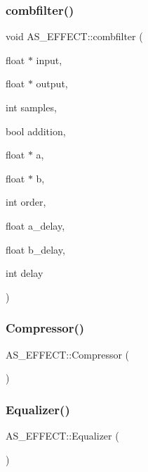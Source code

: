 \subsubsection{combfilter()}
{\footnotesize\ttfamily void A\+S\+\_\+\+E\+F\+F\+E\+C\+T\+::combfilter (\begin{DoxyParamCaption}\item[{float $\ast$}]{input,  }\item[{float $\ast$}]{output,  }\item[{int}]{samples,  }\item[{bool}]{addition,  }\item[{float $\ast$}]{a,  }\item[{float $\ast$}]{b,  }\item[{int}]{order,  }\item[{float}]{a\+\_\+delay,  }\item[{float}]{b\+\_\+delay,  }\item[{int}]{delay }\end{DoxyParamCaption})}

\mbox{\label{class_a_s___e_f_f_e_c_t_a94bbf5632141bb86ae8f4486837cf07b}} 
\subsubsection{Compressor()}
{\footnotesize\ttfamily A\+S\+\_\+\+E\+F\+F\+E\+C\+T\+::\+Compressor (\begin{DoxyParamCaption}{ }\end{DoxyParamCaption})}

\mbox{\label{class_a_s___e_f_f_e_c_t_a04fac13eb6e2a2264d8fbcc204dc92a4}} 
\subsubsection{Equalizer()}
{\footnotesize\ttfamily A\+S\+\_\+\+E\+F\+F\+E\+C\+T\+::\+Equalizer (\begin{DoxyParamCaption}{ }\end{DoxyParamCaption})}

\mbox{\label{class_a_s___e_f_f_e_c_t_a26eb8bb74244fafbade1486843275621}} 

